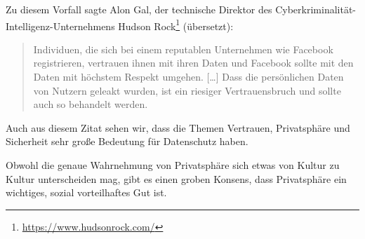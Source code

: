 Zu diesem Vorfall sagte Alon Gal, der technische Direktor des Cyberkriminalität-Intelligenz-Unternehmens Hudson Rock\footnote{\url{https://www.hudsonrock.com/}} (übersetzt):
\blockquote[\cite{holmes_533_2021}]{
    Individuen, die sich bei einem reputablen Unternehmen wie Facebook registrieren, vertrauen ihnen mit ihren Daten
    und Facebook sollte mit den Daten mit höchstem Respekt umgehen. [\dots] 
    Dass die persönlichen Daten von Nutzern geleakt wurden, ist ein riesiger Vertrauensbruch und sollte auch so behandelt werden.
}

Auch aus diesem Zitat sehen wir, dass die Themen Vertrauen, Privatsphäre und Sicherheit sehr große Bedeutung für Datenschutz haben. 

Obwohl die genaue Wahrnehmung von Privatsphäre sich etwas von Kultur zu Kultur unterscheiden mag,
gibt es einen groben Konsens, dass Privatsphäre ein wichtiges, sozial vorteilhaftes Gut ist.\cite{lee_ethical_2016}

